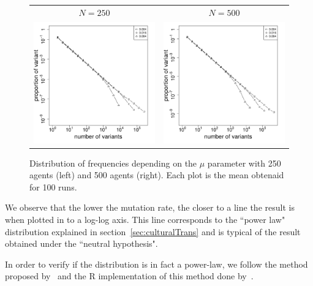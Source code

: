 \documentclass{wscpaperproc}
\begin{document}
\begin{figure}[h]
	\centering
	\begin{tabular}{ c c}
		 $N=250$ & $N=500$ \\
		\includegraphics[width=6cm]{img/allmuRandMaxN250.pdf}&
		\includegraphics[width=6cm]{img/allmuRandMaxN500.pdf}
	\end{tabular}
	\caption{Distribution of frequencies depending on the $\mu$ parameter with 250 agents (left) and 500 agents (right). Each plot is the mean obtenaid for 100 runs.\label{fig:allMutation}}
\end{figure}

We observe that the lower the mutation rate, the closer to a line the result is when plotted in to a log-log axis. This line corresponds to the ``power law" distribution explained in section~\ref{sec:culturalTrans} and is typical of the result obtained under the ``neutral hypothesis". 


In order to verify if the distribution is in fact a power-law, we follow the method proposed by~\cite{clauset2009powerlawdistributionsinempiricaldat} and the R implementation of this method done by~\cite{gillespie_fitting_2015}.
\end{document}
